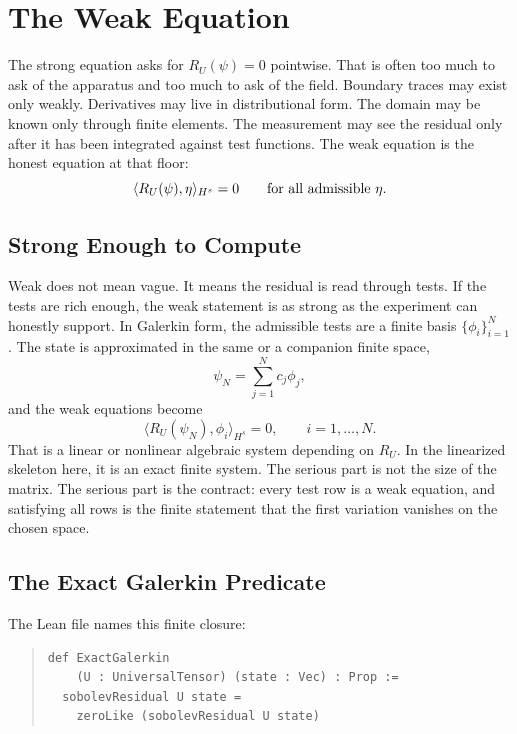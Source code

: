 \chapter{The Weak Equation}
\label{chap:weak-equation}

The strong equation asks for \(R_U(\psi)=0\) pointwise. That is often too much to ask of the apparatus and too
much to ask of the field. Boundary traces may exist only weakly. Derivatives may live in distributional form.
The domain may be known only through finite elements. The measurement may see the residual only after it has
been integrated against test functions. The weak equation is the honest equation at that floor:
\[
  \langle R_U(\psi), \eta\rangle_{H^s} = 0
  \qquad
  \hbox{for all admissible }\eta .
\]

\section{Strong Enough to Compute}

Weak does not mean vague. It means the residual is read through tests. If the tests are rich enough, the weak
statement is as strong as the experiment can honestly support. In Galerkin form, the admissible tests are a
finite basis \(\{\phi_i\}_{i=1}^{N}\). The state is approximated in the same or a companion finite space,
\[
  \psi_N = \sum_{j=1}^{N} c_j \phi_j,
\]
and the weak equations become
\[
  \langle R_U(\psi_N), \phi_i\rangle_{H^s}=0,
  \qquad i=1,\ldots,N.
\]
That is a linear or nonlinear algebraic system depending on \(R_U\). In the linearized skeleton here, it is an
exact finite system. The serious part is not the size of the matrix. The serious part is the contract: every
test row is a weak equation, and satisfying all rows is the finite statement that the first variation vanishes
on the chosen space.

\section{The Exact Galerkin Predicate}

The Lean file names this finite closure:

\begin{quote}\small
\begin{verbatim}
def ExactGalerkin
    (U : UniversalTensor) (state : Vec) : Prop :=
  sobolevResidual U state =
    zeroLike (sobolevResidual U state)
\end{verbatim}
\end{quote}

